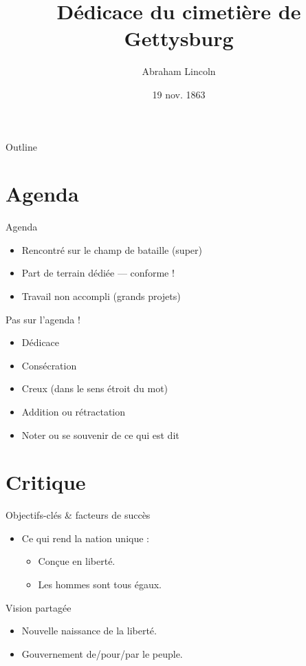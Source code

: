 \documentclass{beamer}
\title{Dédicace du cimetière de Gettysburg}
\author{Abraham Lincoln}
\institute{États-Unis d'Amérique}
\date{19 nov. 1863}
\begin{document}
\begin{frame}
  \titlepage
\end{frame}

\begin{frame}{Outline}
  \tableofcontents
\end{frame}

\section{Agenda}

\begin{frame}{Agenda}

\begin{itemize}
  \item Rencontré sur le champ de bataille (super)
  \item Part de terrain dédiée --- conforme !
  \item Travail non accompli (grands projets)
\end{itemize}

\end{frame}

\begin{frame}{Pas sur l'agenda !}

\begin{itemize}[<+->]
  \item Dédicace
  \item Consécration
  \item Creux (dans le sens étroit du mot)
  \item Addition ou rétractation
  \item Noter ou se souvenir de ce qui est dit
\end{itemize}

\end{frame}

\section{Critique}

\begin{frame}{Objectifs-clés \& facteurs de succès}

\begin{itemize}
\item Ce qui rend la nation unique :
  \begin{itemize}
  \item Conçue en liberté.
  \item Les hommes sont tous égaux.
  \end{itemize}
\end{itemize}

\begin{block}{Vision partagée}
\begin{itemize}
  \item Nouvelle naissance de la liberté.
  \item Gouvernement de/pour/par le peuple.
\end{itemize}
\end{block}

\end{frame}
\end{document}
